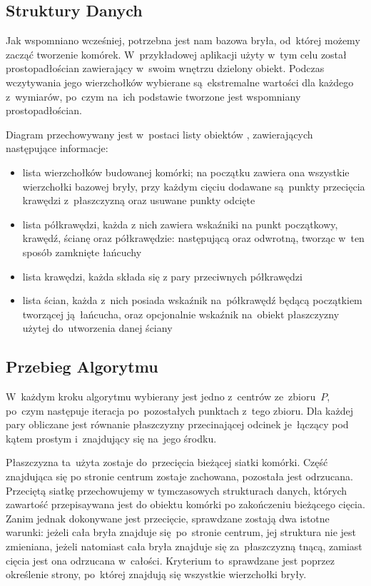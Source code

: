 \documentclass[skorowidz,autorrok,backref,xodstep,oswiadczenie]{wmimgr}
\begin{document}
\subsection{Struktury Danych}

Jak wspomniano wcześniej, potrzebna jest nam bazowa bryła, od~której możemy zacząć tworzenie komórek. W~przykładowej aplikacji użyty w~tym celu został prostopadłościan zawierający w~swoim wnętrzu dzielony obiekt. Podczas wczytywania jego wierzchołków wybierane są~ekstremalne wartości dla każdego z~wymiarów, po~czym na~ich podstawie tworzone jest wspomniany prostopadłościan.

Diagram przechowywany jest w~postaci listy obiektów , zawierających następujące informacje:
\begin{itemize}
\item
lista wierzchołków budowanej komórki; na początku zawiera ona wszystkie wierzchołki bazowej bryły, przy każdym cięciu dodawane są~punkty przecięcia krawędzi z~płaszczyzną oraz usuwane punkty odcięte
\item
lista półkrawędzi, każda z nich zawiera wskaźniki na punkt początkowy, krawędź, ścianę oraz półkrawędzie: następującą oraz odwrotną, tworząc w~ten sposób zamknięte łańcuchy
\item
lista krawędzi, każda składa się z pary przeciwnych półkrawędzi
\item
lista ścian, każda z~nich posiada wskaźnik na~półkrawędź będącą początkiem tworzącej ją~łańcucha, oraz opcjonalnie wskaźnik na~obiekt płaszczyzny użytej do~utworzenia danej ściany
\end{itemize}

\subsection{Przebieg Algorytmu}

W~każdym kroku algorytmu wybierany jest jedno z~centrów ze~zbioru~$P$, po~czym następuje iteracja po~pozostałych punktach z~tego zbioru. Dla każdej pary obliczane jest równanie płaszczyzny przecinającej odcinek je~łączący pod kątem prostym i~znajdujący się na~jego środku.

Płaszczyzna ta~użyta zostaje do~przecięcia bieżącej siatki komórki. Część znajdująca się po stronie centrum zostaje zachowana, pozostała jest odrzucana. Przeciętą siatkę przechowujemy w tymczasowych strukturach danych, których zawartość przepisaywana jest do obiektu komórki po zakończeniu bieżącego cięcia. Zanim jednak dokonywane jest przecięcie, sprawdzane zostają dwa istotne warunki: jeżeli cała bryła znajduje się~po~stronie centrum, jej struktura nie jest zmieniana, jeżeli natomiast cała bryła znajduje się za~płaszczyzną tnącą, zamiast cięcia jest ona odrzucana w~całości. Kryterium to~sprawdzane jest poprzez określenie strony, po~której znajdują się wszystkie wierzchołki bryły.
\end{document}

